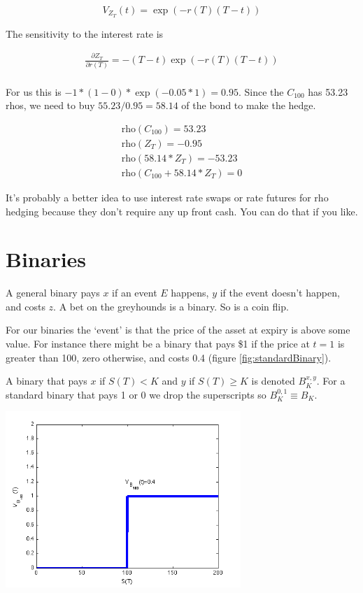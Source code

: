 \[ V_{Z_T}(t) = \exp(-r(T)(T-t))\]

The sensitivity to the interest rate is

\begin{eqnarray*}
\frac{\partial Z_T}{\partial r(T)} = -(T-t) \exp(-r(T)(T-t)) \\
\end{eqnarray*}

For us this is $-1*(1-0)*\exp(-0.05*1) = 0.95$. Since the $C_{100}$ has 53.23 rhos, we need to buy $55.23/0.95 = 58.14$ of the bond to make the hedge. 

\begin{eqnarray*}
\mbox{rho}(C_{100})=53.23\\
\mbox{rho}(Z_T) = -0.95\\
\mbox{rho}(58.14*Z_T) = -53.23\\
\mbox{rho}(C_{100}+58.14*Z_T) = 0
\end{eqnarray*}

It's probably a better idea to use interest rate swaps or rate futures for rho hedging because they don't require any up front cash. You can do that if you like.

\section{Binaries}

A general binary pays $x$ if an event $E$ happens, $y$ if the event doesn't happen, and costs $z$. A bet on the greyhounds is a binary. So is a coin flip. 

For our binaries the `event' is that the price of the asset at expiry is above some value. For instance there might be a binary that pays \$1 if the price at $t=1$ is greater than 100, zero otherwise, and costs 0.4 (figure \ref{fig:standardBinary}). 

A binary that pays $x$ if $S(T)<K$ and $y$ if $S(T)\geq K$ is denoted $B_{K}^{x,y}$. For a standard binary that pays 1 or 0 we drop the superscripts so $B_{K}^{0,1} \equiv B_{K}$.

  \begin{center}
\includegraphics[width=3.5in]{pics/standardBinary}%
\label{fig:standardBinary}%
\end{center}

